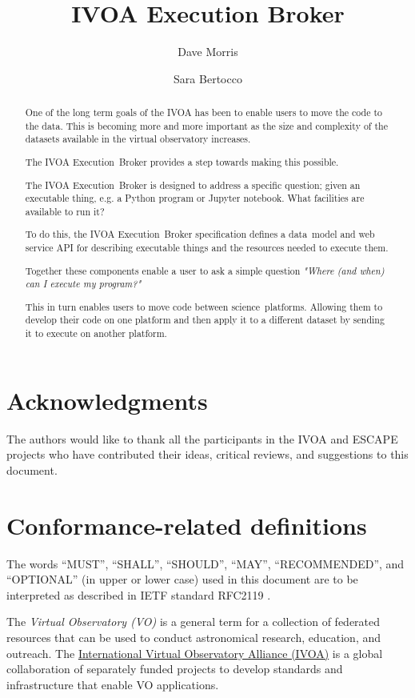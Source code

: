 \documentclass[11pt,a4paper]{ivoa}
\title{IVOA Execution Broker}
\author[http://www.ivoa.net/twiki/bin/view/IVOA/DaveMorris]
       {Dave Morris}
\author[http://www.ivoa.net/twiki/bin/view/IVOA/SaraBertocco]
       {Sara Bertocco}
\newcommand{\datamodel} {data~model}
\newcommand{\webservice} {web service}
\newcommand{\ivoa} {IVOA}
\newcommand{\executionbroker} {Execution~Broker}
\newcommand{\jupyternotebook} {Jupyter notebook}
\newcommand{\pythonprogram} {Python program}
\newcommand{\footurl}[1] {\footnote{\url{#1}}}
\newcommand{\dataset} {dataset}
\newcommand{\scienceplatform} {science~platform}
\begin{document}
\begin{abstract}
\label{abstract}

One of the long term goals of the IVOA has been to enable users to
move the code to the data.
This is becoming more and more important as the size and complexity
of the \dataset{}s available in the virtual observatory increases.

The \ivoa{} \executionbroker{} provides a step towards making this possible.

The \ivoa{} \executionbroker{} is designed to address a specific question;
given an executable thing, e.g. a \pythonprogram{} or \jupyternotebook{}.
What facilities are available to run it?

To do this, the \ivoa{} \executionbroker{} specification defines
a \datamodel{} and \webservice{} API for describing executable things
and the resources needed to execute them.

Together these components enable a user to ask a simple question
\textit{"Where (and when) can I execute my program?"}

This in turn enables users to move code between \scienceplatform{}s.
Allowing them to develop their code on one platform and then apply it to a different
\dataset{} by sending it to execute on another platform.

\end{abstract}

\section*{Acknowledgments}
\label{acknowledgments}

The authors would like to thank all the participants in the IVOA and ESCAPE projects
who have contributed their ideas, critical reviews, and suggestions to this document.

\section*{Conformance-related definitions}

The words ``MUST'', ``SHALL'', ``SHOULD'', ``MAY'', ``RECOMMENDED'', and
``OPTIONAL'' (in upper or lower case) used in this document are to be
interpreted as described in IETF standard RFC2119 \citep{std:RFC2119}.

The \emph{Virtual Observatory (VO)} is a general term for a collection of
federated resources that can be used to conduct astronomical research,
education, and outreach.
The \href{https://www.ivoa.net}{International Virtual Observatory Alliance (IVOA)}
is a global collaboration of separately funded projects to develop standards and
infrastructure that enable VO applications.
\end{document}
